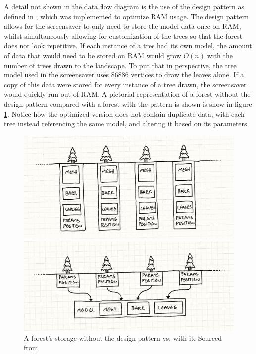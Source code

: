 \documentclass[10pt, openany]{book}
\begin{document}
A detail not shown in the data flow diagram is the use of the \textit{} design pattern as defined in \citep{gamma1995design}, which was implemented to optimize RAM usage. The \textit{} design pattern allows for the screensaver to only need to store the model data once on RAM, whilst simultaneously allowing for customization of the trees so that the forest does not look repetitive. If each instance of a tree had its own model, the amount of data that would need to be stored on RAM would grow $O(n)$ with the number of trees drawn to the landscape. To put that in perspective, the tree model used in the screensaver uses 86886 vertices to draw the leaves alone. If a copy of this data were stored for every instance of a tree drawn, the screensaver would quickly run out of RAM. A pictorial representation of a forest without the \textit{} design pattern compared with a forest with the pattern is shown is show in figure \ref{fig:flyweight}. Notice how the optimized version does not contain duplicate data, with each tree instead referencing the same model, and altering it based on its parameters.

\begin{figure}[H]
\centering
\begin{minipage}{.46\textwidth}
  \centering
  \includegraphics[width=.98\linewidth]{flyweight-trees}
\end{minipage}%
\begin{minipage}{.54\textwidth}
  \centering
  \includegraphics[width=.98\linewidth]{flyweight-tree-model}
\end{minipage}
\caption[Flyweight Forest]{A forest's storage without the \textit{} design pattern vs. with it. Sourced from \citep{nystrom2014game}}
\label{fig:flyweight}
\end{figure}	
\end{document}
